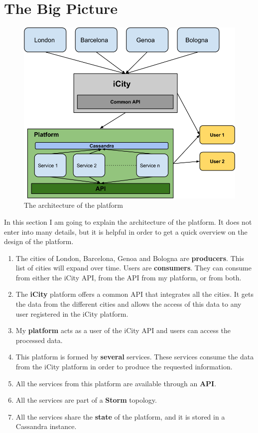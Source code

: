  
\section{The Big Picture}

\begin{figure}
  \centering
  \includegraphics[scale=0.5]{overview/images/big.png}
  \caption{The architecture of the platform}\label{fig:architecture}
\end{figure}

In this section I am going to explain the architecture of the platform. It does
not enter into many details, but it is helpful in order to get a quick overview
on the design of the platform.

\begin{enumerate}
  \item The cities of London, Barcelona, Genoa and Bologna are {\bf producers}.
This list of cities will expand over time. Users are {\bf consumers}. They can
consume from either the iCity \ac{API}, from the \ac{API} from my platform, or
from both.
  \item The {\bf iCity} platform offers a common \ac{API} that integrates all
the cities. It gets the data from the different cities and allows the access of
this data to any user registered in the iCity platform.
  \item My {\bf platform} acts as a user of the iCity \ac{API} and users can
access the processed data.
  \item This platform is formed by {\bf several} services. These services
consume the data from the iCity platform in order to produce the requested
information.
  \item All the services from this platform are available through an {\bf
\ac{API}}.
  \item All the services are part of a {\bf Storm} topology.
  \item All the services share the {\bf state} of the platform, and it is stored
in a Cassandra instance.
\end{enumerate}

